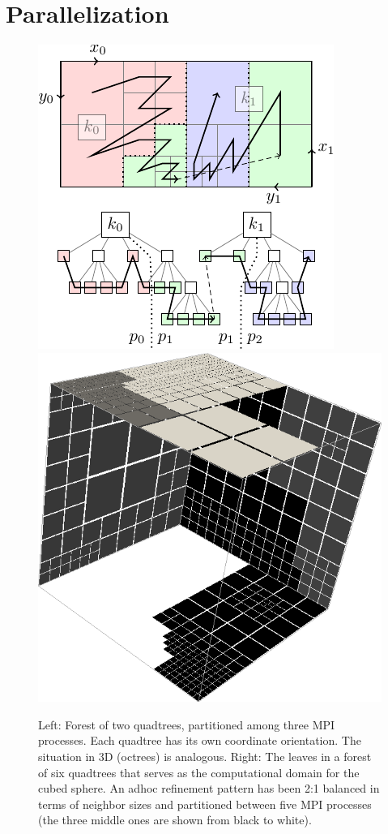 \documentclass{IOS-Book-Article}     %
\begin{document}



\section{Parallelization}

\begin{figure}
\begin{center}
\includegraphics[width=.4\columnwidth]{../figs_misc/forest_stacked}
\hspace{.05\columnwidth}
\includegraphics[width=.4\columnwidth]{../figs_misc/cubed3}
\end{center}
\caption{Left: Forest of two quadtrees, partitioned among three MPI processes.
Each quadtree has its own coordinate orientation.  The situation in 3D
(octrees) is analogous.  Right: The leaves in a forest of six quadtrees that
serves as the computational domain for the cubed sphere.  An adhoc refinement
pattern has been 2:1 balanced in terms of neighbor sizes and partitioned
between five MPI processes (the three middle ones are shown from black to
white).}
\label{cubed3}
\end{figure}
\end{document}
